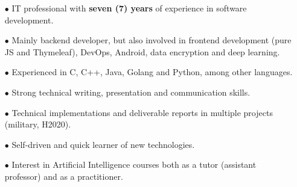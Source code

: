 \begin{itemize}

    \item[$\bullet$] IT professional with \textbf{seven (7) years} of experience in software development. 
    
    \item[$\bullet$] Mainly backend developer, but also involved in frontend development (pure JS and Thymeleaf), DevOps, Android, data encryption and deep learning. 
    
    \item[$\bullet$] Experienced in C, C++, Java, Golang and Python, among other languages.


    \item[$\bullet$] Strong technical writing, presentation and communication skills.
    
    \item[$\bullet$] Technical implementations and deliverable reports in multiple projects (military, H2020).

    \item[$\bullet$] Self-driven and quick learner of new technologies.

    \item[$\bullet$] Interest in Artificial Intelligence courses both as a tutor (assistant professor) and as a practitioner.

\end{itemize}